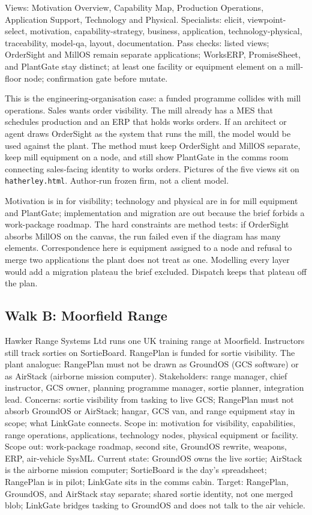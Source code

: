 \documentclass[10pt,journal,compsoc]{IEEEtran}
\begin{document}
Views: Motivation Overview, Capability Map, Production Operations, Application Support, Technology and Physical. Specialists: elicit, viewpoint-select, motivation, capability-strategy, business, application, technology-physical, traceability, model-qa, layout, documentation. Pass checks: listed views; OrderSight and MillOS remain separate applications; WorksERP, PromiseSheet, and PlantGate stay distinct; at least one facility or equipment element on a mill-floor node; confirmation gate before mutate.

This is the engineering-organisation case: a funded programme collides with mill operations. Sales wants order visibility. The mill already has a MES that schedules production and an ERP that holds works orders. If an architect or agent draws OrderSight as the system that runs the mill, the model would be used against the plant. The method must keep OrderSight and MillOS separate, keep mill equipment on a node, and still show PlantGate in the comms room connecting sales-facing identity to works orders. Pictures of the five views sit on \texttt{hatherley.html}. Author-run frozen firm, not a client model.

Motivation is in for visibility; technology and physical are in for mill equipment and PlantGate; implementation and migration are out because the brief forbids a work-package roadmap. The hard constraints are method tests: if OrderSight absorbs MillOS on the canvas, the run failed even if the diagram has many elements. Correspondence here is equipment assigned to a node and refusal to merge two applications the plant does not treat as one. Modelling every layer would add a migration plateau the brief excluded. Dispatch keeps that plateau off the plan.

\subsection{Walk B: Moorfield Range}

Hawker Range Systems Ltd runs one UK training range at Moorfield. Instructors still track sorties on SortieBoard. RangePlan is funded for sortie visibility. The plant analogue: RangePlan must not be drawn as GroundOS (GCS software) or as AirStack (airborne mission computer). Stakeholders: range manager, chief instructor, GCS owner, planning programme manager, sortie planner, integration lead. Concerns: sortie visibility from tasking to live GCS; RangePlan must not absorb GroundOS or AirStack; hangar, GCS van, and range equipment stay in scope; what LinkGate connects. Scope in: motivation for visibility, capabilities, range operations, applications, technology nodes, physical equipment or facility. Scope out: work-package roadmap, second site, GroundOS rewrite, weapons, ERP, air-vehicle SysML. Current state: GroundOS owns the live sortie; AirStack is the airborne mission computer; SortieBoard is the day's spreadsheet; RangePlan is in pilot; LinkGate sits in the comms cabin. Target: RangePlan, GroundOS, and AirStack stay separate; shared sortie identity, not one merged blob; LinkGate bridges tasking to GroundOS and does not talk to the air vehicle.
\end{document}
